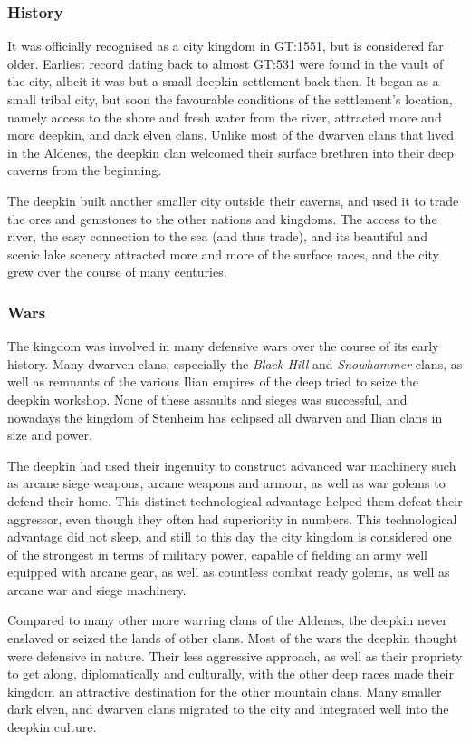 \subsubsection{History}

It was officially recognised as a city kingdom in GT:1551, but is considered
far older. Earliest record dating back to almost GT:531 were found in the
vault of the city, albeit it was but a small deepkin settlement back then. It
began as a small tribal city, but soon the favourable conditions of the
settlement's location, namely access to the shore and fresh water from the
river, attracted more and more deepkin, and dark elven clans. Unlike most of
the dwarven clans that lived in the Aldenes, the deepkin clan welcomed their
surface brethren into their deep caverns from the beginning.

The deepkin built another smaller city outside their caverns, and used it to
trade the ores and gemstones to the other nations and kingdoms. The access to
the river, the easy connection to the sea (and thus trade), and its beautiful
and scenic lake scenery attracted more and more of the surface races, and the
city grew over the course of many centuries.

\subsubsection{Wars}

The kingdom was involved in many defensive wars over the course of its early
history. Many dwarven clans, especially the \emph{Black Hill} and
\emph{Snowhammer} clans, as well as remnants of the various Ilian empires of
the deep tried to seize the deepkin workshop. None of these assaults and sieges
was successful, and nowadays the kingdom of Stenheim has eclipsed all dwarven
and Ilian clans in size and power.

The deepkin had used their ingenuity to construct advanced war machinery such
as arcane siege weapons, arcane weapons and armour, as well as war golems to
defend their home. This distinct technological advantage helped them defeat
their aggressor, even though they often had superiority in numbers.  This
technological advantage did not sleep, and still to this day the city kingdom
is considered one of the strongest in terms of military power, capable of
fielding an army well equipped with arcane gear, as well as countless combat
ready golems, as well as arcane war and siege machinery.

Compared to many other more warring clans of the Aldenes, the deepkin never
enslaved or seized the lands of other clans. Most of the wars the deepkin
thought were defensive in nature. Their less aggressive approach, as well as
their propriety to get along, diplomatically and culturally, with the other
deep races made their kingdom an attractive destination for the other mountain
clans. Many smaller dark elven, and dwarven clans migrated to the city and
integrated well into the deepkin culture.

